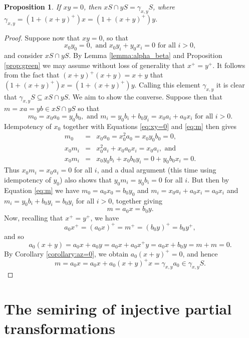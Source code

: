 \documentclass[a4paper, 11pt]{article}
\theoremstyle{plain}
\newtheorem{proposition}[theorem]{Proposition}
\theoremstyle{definition}
\begin{document}
\begin{proposition} \label{proposition:xy=0}
If $xy = 0$, then $xS \cap yS = \gamma_{x,y}S$, where $\gamma_{x,y} = (1 + (x+y)^+ )x = (1 + (x+y)^+ )y$.
\end{proposition}

\begin{proof}
Suppose now that $xy=0$, so that
\begin{equation}
\label{eq:xy=0}
x_0y_0=0, \mbox{ and } x_0y_i+y_0x_i=0 \mbox{ for all } i>0,
\end{equation}
and consider $xS \cap yS$. By Lemma \ref{lemma:alpha_beta} and Proposition \ref{prop:green} we may assume without loss of generality that $x^+ = y^+$. It follows from the fact that $(x+y)^+ (x+y) = x+y$ that $(1 + (x+y)^+)x = (1 + (x+y)^+ )y$. Calling this element $\gamma_{x,y}$ it is clear that $\gamma_{x,y}S \subseteq xS \cap yS$. We aim to show the converse. Suppose then that $m = xa=yb \in xS \cap yS$ so that
\begin{equation}
\label{eq:m}
m_0=x_0a_0=y_0b_0, \mbox{ and } m_i= y_0b_i+b_0y_i=x_0a_i+a_0x_i \mbox{ for all } i>0.
\end{equation}
Idempotency of $x_0$ together with Equations \eqref{eq:xy=0} and \eqref{eq:m} then gives \begin{eqnarray*}
m_0 &=& x_0a_0 = x_0^2a_0 = x_0y_0b_0 = 0,\\
x_0m_i &=& x_0^2a_i+x_0a_0x_i = x_0a_i,  \mbox{ and}\\   
x_0m_i &=&x_0y_0b_i + x_0b_0y_i = 0 + y_0b_0x_i = 0.
\end{eqnarray*}
Thus $x_0m_i=x_0a_i=0$ for all $i$, and a dual argument (this time using idempotency of $y_0$) also shows that $y_0m_i=y_0b_i=0$ for all $i$. But then by Equation \eqref{eq:m} we have $m_0= a_0x_0=b_0y_0$ and
$m_i = x_0a_i + a_0x_i = a_0x_i$ and $m_i = y_0b_i + b_0y_i = b_0y_i$ for all $i>0$, together giving $$m=a_0x =b_0y.$$
Now, recalling that $x^+ = y^+$, we have
\[
    a_0 x^+ = (a_0 x)^+ = m^+ = (b_0 y)^+ = b_0 y^+,
\]
and so
$$a_0(x+y) = a_0x+a_0y = a_0x + a_0 x^+ y = a_0x + b_0y =m+m= 0.$$
By Corollary \ref{corollary:az=0}, we obtain $a_0 (x+y)^+ = 0$, and hence
\[
    m = a_0 x = a_0 x +  a_0 (x+y)^+ x = \gamma_{x,y} a_0 \in \gamma_{x,y} S.
\]
\end{proof}







\section{The semiring of injective partial transformations} \label{section:injective}
\end{document}
